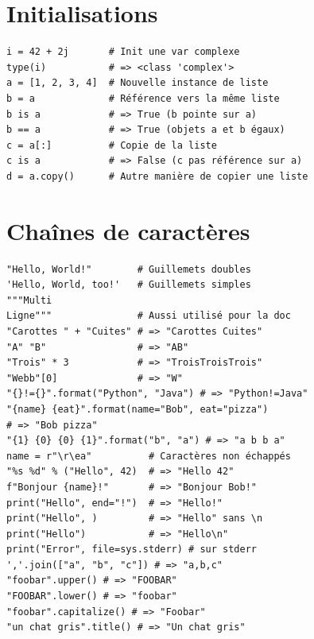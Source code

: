 \documentclass{article}
\begin{document}
\begin{multicols*}{4}
\section*{Initialisations}

\begin{lstlisting}
i = 42 + 2j       # Init une var complexe
type(i)           # => <class 'complex'>
a = [1, 2, 3, 4]  # Nouvelle instance de liste 
b = a             # Référence vers la même liste
b is a            # => True (b pointe sur a)
b == a            # => True (objets a et b égaux)
c = a[:]          # Copie de la liste
c is a            # => False (c pas référence sur a)
d = a.copy()      # Autre manière de copier une liste
\end{lstlisting}

\section*{Chaînes de caractères}

\begin{lstlisting}
"Hello, World!"        # Guillemets doubles
'Hello, World, too!'   # Guillemets simples
"""Multi 
Ligne"""               # Aussi utilisé pour la doc
"Carottes " + "Cuites" # => "Carottes Cuites"
"A" "B"                # => "AB"
"Trois" * 3            # => "TroisTroisTrois"
"Webb"[0]              # => "W"
"{}!={}".format("Python", "Java") # => "Python!=Java"
"{name} {eat}".format(name="Bob", eat="pizza") 
# => "Bob pizza"
"{1} {0} {0} {1}".format("b", "a") # => "a b b a"
name = r"\r\ea"          # Caractères non échappés
"%s %d" % ("Hello", 42)  # => "Hello 42"
f"Bonjour {name}!"       # => "Bonjour Bob!"
print("Hello", end="!")  # => "Hello!"
print("Hello", )         # => "Hello" sans \n
print("Hello")           # => "Hello\n"
print("Error", file=sys.stderr) # sur stderr 
','.join(["a", "b", "c"]) # => "a,b,c"
"foobar".upper() # => "FOOBAR"
"FOOBAR".lower() # => "foobar"
"foobar".capitalize() # => "Foobar"
"un chat gris".title() # => "Un chat gris"

\end{lstlisting}


\end{multicols*}
\end{document}

